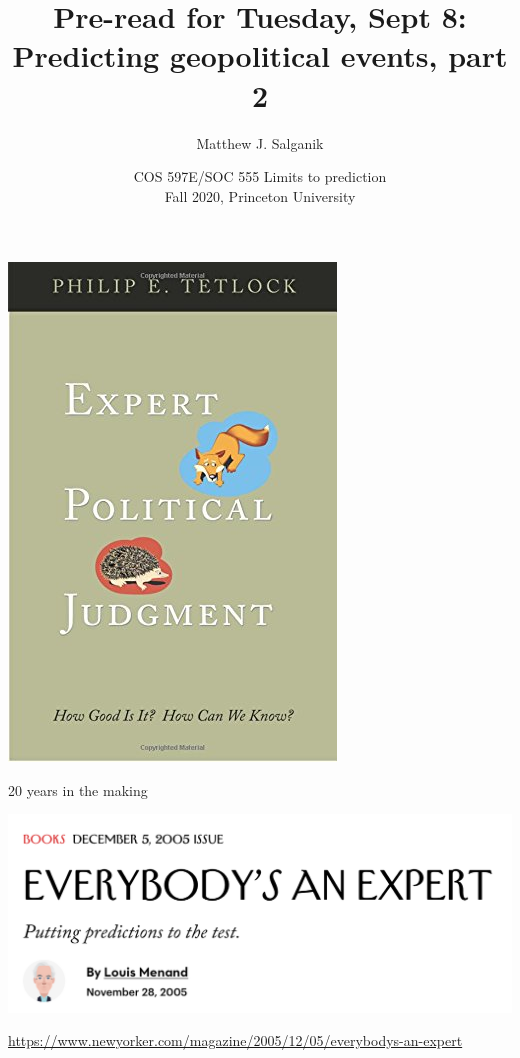\documentclass[aspectratio=169]{beamer}
\title[]{Pre-read for Tuesday, Sept 8:\\Predicting geopolitical events, part 2}
\author[]{Matthew J. Salganik}
\institute[]{}
\date[]{COS 597E/SOC 555 Limits to prediction\\Fall 2020, Princeton University}
\begin{document}
\frame{\titlepage}
\begin{frame}
\frametitle{}

\begin{center}
\includegraphics[height=0.7\textheight]{figures/tetlock_expert_2005_cover}
\end{center}

\vfill
20 years in the making

\end{frame}
\begin{frame}

\begin{center}
\includegraphics[width=0.9\textheight]{figures/menand_everybodys_2005_title}
\end{center}

\vfill
\url{https://www.newyorker.com/magazine/2005/12/05/everybodys-an-expert}

\end{frame}
\end{document}
